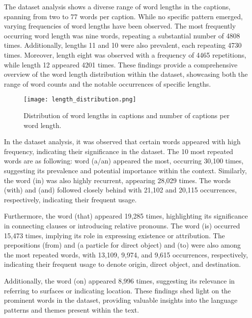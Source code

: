 \documentclass[runningheads]{llncs}
\begin{document}
The dataset analysis shows a diverse range of word lengths in the captions, spanning from two to 77 words per caption. While no specific pattern emerged, varying frequencies of word lengths have been observed. The most frequently occurring word length was nine words, repeating a substantial number of 4808 times. Additionally, lengths 11 and 10 were also prevalent, each repeating 4730 times. Moreover, length eight was observed with a frequency of 4465 repetitions, while length 12 appeared 4201 times. These findings provide a comprehensive overview of the word length distribution within the dataset, showcasing both the range of word counts and the notable occurrences of specific lengths.
\vspace{-\baselineskip}
\begin{figure}
  \begin{center}
    \texttt{[image: length\_distribution.png]}
    \caption{Distribution of word lengths in captions and number of captions per word length.}
    \label{fig3}
  \end{center}
\end{figure}
\vspace{-\baselineskip}
In the dataset analysis, it was observed that certain words appeared with high frequency, indicating their significance in the dataset. The 10 most repeated words are as following: word (a/an) appeared the most, occurring 30,100 times, suggesting its prevalence and potential importance within the context. Similarly, the word (in) was also highly recurrent, appearing 28,029 times. The words (with) and (and) followed closely behind with 21,102 and 20,115 occurrences, respectively, indicating their frequent usage.

Furthermore, the word (that) appeared 19,285 times, highlighting its significance in connecting clauses or introducing relative pronouns. The word (is) occurred 15,473 times, implying its role in expressing existence or attribution. The prepositions (from) and (a particle for direct object) and (to) were also among the most repeated words, with 13,109, 9,974, and 9,615 occurrences, respectively, indicating their frequent usage to denote origin, direct object, and destination.

Additionally, the word (on) appeared 8,996 times, suggesting its relevance in referring to surfaces or indicating location. These findings shed light on the prominent words in the dataset, providing valuable insights into the language patterns and themes present within the text.
\end{document}
